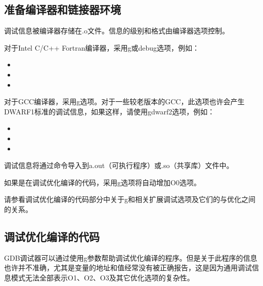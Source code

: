 \documentclass[a4paper,12pt,english]{sphinxmanual}
\begin{document}
\subsection{准备编译器和链接器环境}
\label{\detokenize{debug/debug:id8}}
\sphinxAtStartPar
调试信息被编译器存储在.o文件。信息的级别和格式由编译器选项控制。

\sphinxAtStartPar
对于Intel C/C++ Fortran编译器，采用\sphinxhyphen{}g或\sphinxhyphen{}debug选项，例如：
\begin{itemize}
\item {} 
\sphinxAtStartPar
{}

\item {} 
\sphinxAtStartPar
{}

\item {} 
\sphinxAtStartPar
{}

\end{itemize}

\sphinxAtStartPar
对于GCC编译器，采用\sphinxhyphen{}g选项。对于一些较老版本的GCC，此选项也许会产生DWARF\sphinxhyphen{}1标准的调试信息，如果这样，请使用\sphinxhyphen{}gdwarf\sphinxhyphen{}2选项，例如：
\begin{itemize}
\item {} 
\sphinxAtStartPar
{}

\item {} 
\sphinxAtStartPar
{}

\item {} 
\sphinxAtStartPar
{}

\end{itemize}

\sphinxAtStartPar
调试信息将通过命令导入到a.out（可执行程序）或.so（共享库）文件中。

\sphinxAtStartPar
如果是在调试优化编译的代码，采用\sphinxhyphen{}g选项将自动增加\sphinxhyphen{}O0选项。

\sphinxAtStartPar
请参看调试优化编译的代码部分中关于\sphinxhyphen{}g和相关扩展调试选项及它们的与优化之间的关系。


\subsection{调试优化编译的代码}
\label{\detokenize{debug/debug:id9}}
\sphinxAtStartPar
GDB调试器可以通过使用\sphinxhyphen{}g参数帮助调试优化编译的程序。但是关于此程序的信息也许并不准确，尤其是变量的地址和值经常没有被正确报告，这是因为通用调试信息模式无法全部表示\sphinxhyphen{}O1、\sphinxhyphen{}O2、\sphinxhyphen{}O3及其它优化选项的复杂性。
\end{document}

